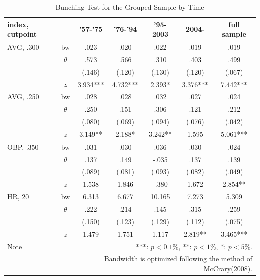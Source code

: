 \documentclass[dvipdfmx,12pt]{beamer}
\begin{document}
\begin{frame}
  \begin{table}
    \centering
    \caption{Bunching Test for the Grouped Sample by Time}
    \label{Mani-Era}
    \tiny
    \begin{tabular}{lcccccc} \hline
      index, cutpoint &  & '57-'75 &'76-'94 & '95-2003 & 2004- &full sample \\ \hline \hline
      AVG, .300 & bw & .023 & .020 & .022 & .019 & .019 \\
      & $\theta$ & .573 & .566 & .310 & .403 & .499 \\
      & & (.146) & (.120) & (.130) & (.120) & (.067) \\
      & $z$ & 3.934*** & 4.732*** & 2.393* & 3.376*** & 7.442*** \\ \hline
      AVG, .250 & bw & .028 & .028 & .032 & .027 & .024 \\
      & $\theta$ & .250 & .151 & .306 & .121 & .212 \\
      & & (.080) & (.069) & (.094)& (.076) & (.042) \\
      & $z$ & 3.149** & 2.188* & 3.242** & 1.595 & 5.061*** \\ \hline
      OBP, .350 & bw & .031 & .030 & .036 & .030 & .024 \\
      & $\theta$ & .137 & .149 & -.035 & .137 & .139 \\
      & & (.089) & (.081) & (.093) & (.082) & (.049) \\
      & $z$ & 1.538 & 1.846 & -.380 & 1.672 & 2.854** \\ \hline
      HR, 20 & bw & 6.313 & 6.677 & 10.165 & 7.273 & 5.309 \\
      & $\theta$ & .222 & .214 & .145 & .315 & .259 \\
      & & (.150) & (.123) & (.129) & (.112) & (.075) \\
      & $z$ & 1.479 & 1.751 & 1.117 & 2.819** & 3.465*** \\ \hline
      Note & \multicolumn{6}{r}{
      ***: $p<0.1\%$, **: $p<1\%$, *: $p<5\%$.
      }\\
      & \multicolumn{6}{r}{
      Bandwidth is optimized following the method of McCrary(2008).
      }
    \end{tabular}
  \end{table}

\end{frame}
\end{document}
